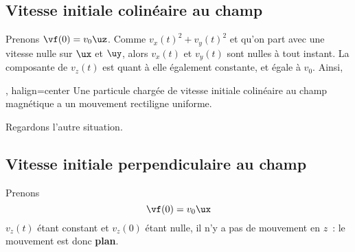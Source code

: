 \documentclass[../main/main.tex]{subfiles}
\begin{document}
\subsection{Vitesse initiale colinéaire au champ}
Prenons $\vf(0) = v_0\uz$. Comme $v_x(t)^2 + v_y(t)^2$ et qu'on part avec une
vitesse nulle sur $\ux$ et $\uy$, alors $v_x(t)$ et $v_y(t)$ sont nulles à tout
instant. La composante de $v_z(t)$ est quant à elle également constante, et
égale à $v_0$. Ainsi,
\begin{tror}{, halign=center}
    Une particule chargée de vitesse initiale colinéaire au champ magnétique a
    un mouvement rectiligne uniforme.
\end{tror}

Regardons l'autre situation.
\subsection{Vitesse initiale perpendiculaire au champ}
Prenons
\[\vf(0) = v_0\ux\]
$v_z(t)$ étant constant et $v_z(0)$ étant nulle, il n'y a pas de mouvement en
$z$~: le mouvement est donc \textbf{plan}.
\end{document}
